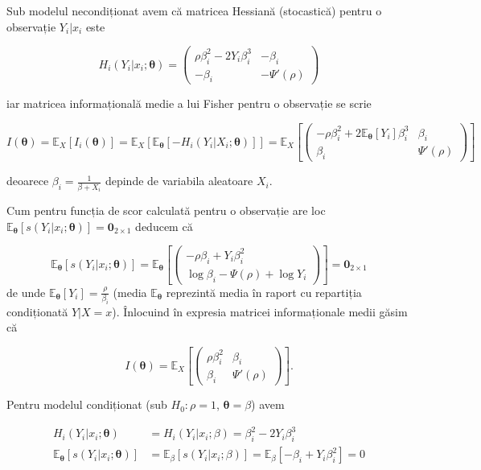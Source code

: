 \documentclass[]{article}
\begin{document}
Sub modelul necondiționat avem că matricea Hessiană (stocastică) pentru
o observație \(Y_i|x_i\) este

\[
H_i(Y_i|x_i;\boldsymbol{\theta}) = 
  \begin{pmatrix}
    \rho\beta_i^2 - 2Y_i\beta_i^3 & -\beta_i\\ 
    -\beta_i & -\Psi'(\rho)
  \end{pmatrix}
\]

iar matricea informațională medie a lui Fisher pentru o observație se
scrie

\[
  I(\boldsymbol{\theta}) = \mathbb{E}_{X}[I_i(\boldsymbol{\theta})] = \mathbb{E}_{X}[\mathbb{E}_{\boldsymbol{\theta}}[-H_i(Y_i|X_i;\boldsymbol{\theta})]] = \mathbb{E}_{X}\left[\begin{pmatrix}
    -\rho\beta_i^2 + 2\mathbb{E}_{\boldsymbol{\theta}}[Y_i]\beta_i^3 & \beta_i\\ 
    \beta_i & \Psi'(\rho)
  \end{pmatrix}\right]
\]

deoarece \(\beta_i = \frac{1}{\beta+X_i}\) depinde de variabila
aleatoare \(X_i\).

Cum pentru funcția de scor calculată pentru o observație are loc
\(\mathbb{E}_{\boldsymbol{\theta}}[s(Y_i|x_i;\boldsymbol{\theta})] = \mathbf{0}_{2\times 1}\)
deducem că

\[
\mathbb{E}_{\boldsymbol{\theta}}[s(Y_i|x_i;\boldsymbol{\theta})] = \mathbb{E}_{\boldsymbol{\theta}}\left[\begin{pmatrix}
  -\rho\beta_i + Y_i\beta_i^2\\ 
    \log{\beta_i} - \Psi(\rho) + \log{Y_i}
\end{pmatrix}\right] = \mathbf{0}_{2\times 1}
\] de unde
\(\mathbb{E}_{\boldsymbol{\theta}}[Y_i] = \frac{\rho}{\beta_i}\) (media
\(\mathbb{E}_{\boldsymbol{\theta}}\) reprezintă media în raport cu
repartiția condiționată \(Y|X = x\)). Înlocuind în expresia matricei
informaționale medii găsim că

\[
  I(\boldsymbol{\theta}) = \mathbb{E}_{X}\left[\begin{pmatrix}
    \rho\beta_i^2  & \beta_i\\ 
    \beta_i & \Psi'(\rho)
  \end{pmatrix}\right].
\]

Pentru modelul condiționat (sub \(H_0:\rho = 1\),
\(\boldsymbol{\theta} = \beta\)) avem

\begin{align*}
  H_i(Y_i|x_i;\boldsymbol{\theta}) &= H_i(Y_i|x_i;\beta) = \beta_i^2 - 2Y_i\beta_i^3\\
  \mathbb{E}_{\boldsymbol{\theta}}[s(Y_i|x_i;\boldsymbol{\theta})] &= \mathbb{E}_{\beta}[s(Y_i|x_i;\beta)] = \mathbb{E}_{\beta}[-\beta_i + Y_i\beta_i^2] = 0
\end{align*}
\end{document}
